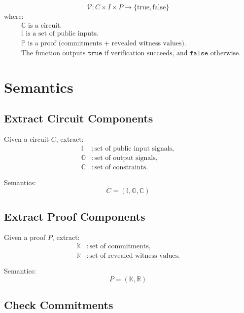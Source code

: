 \documentclass{article}
\begin{document}
\begin{equation}
\mathcal{V} : C \times I \times P \to \{ \text{true}, \text{false} \}
\end{equation}
where:
\[
\begin{aligned}
    &\mathbb{C} \text{ is a circuit.} \\
    &\mathbb{I} \text{ is a set of public inputs.} \\
    &\mathbb{P} \text{ is a proof (commitments + revealed witness values).} \\
    &\text{The function outputs } \texttt{true} \text{ if verification succeeds, and } \texttt{false} \text{ otherwise.}
\end{aligned}
\]

\section{Semantics}

\subsection{Extract Circuit Components}
Given a circuit $C$, extract:
\begin{align*}
    \mathbb{I} & : \text{set of public input signals},\\
    \mathbb{O} & : \text{set of output signals},\\
    \mathbb{C} & : \text{set of constraints}.
\end{align*}

Semantics:
\begin{equation}
    C = (\mathbb{I}, \mathbb{O}, \mathbb{C})
\end{equation}

\subsection{Extract Proof Components}
Given a proof $P$, extract:
\begin{align*}
    \mathbb{K} & : \text{set of commitments},\\
    \mathbb{R} & : \text{set of revealed witness values}.
\end{align*}

Semantics:
\begin{equation}
    P = (\mathbb{K}, \mathbb{R})
\end{equation}

\subsection{Check Commitments}
\end{document}
